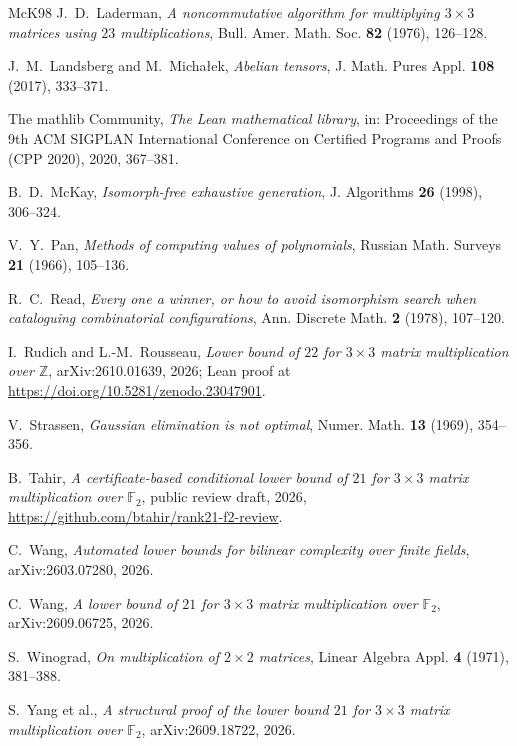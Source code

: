 \documentclass[11pt]{amsart}
\theoremstyle{definition}
\theoremstyle{remark}
\numberwithin{equation}{section}
\newcommand{\F}{\mathbb{F}_2}
\newcommand{\Z}{\mathbb{Z}}
\begin{document}
\begin{thebibliography}{McK98}
J.~D.~Laderman, \emph{A noncommutative algorithm for multiplying $3\times 3$ matrices using $23$ multiplications}, Bull. Amer. Math. Soc. \textbf{82} (1976), 126--128.

J.~M.~Landsberg and M.~Micha\l{}ek, \emph{Abelian tensors}, J. Math. Pures Appl. \textbf{108} (2017), 333--371.

The mathlib Community, \emph{The Lean mathematical library}, in: Proceedings of the 9th ACM SIGPLAN International Conference on Certified Programs and Proofs (CPP 2020), 2020, 367--381.

B.~D.~McKay, \emph{Isomorph-free exhaustive generation}, J. Algorithms \textbf{26} (1998), 306--324.

V.~Y.~Pan, \emph{Methods of computing values of polynomials}, Russian Math. Surveys \textbf{21} (1966), 105--136.

R.~C.~Read, \emph{Every one a winner, or how to avoid isomorphism search when cataloguing combinatorial configurations}, Ann. Discrete Math. \textbf{2} (1978), 107--120.

I.~Rudich and L.-M.~Rousseau, \emph{Lower bound of $22$ for $3\times 3$ matrix multiplication over $\Z$}, arXiv:2610.01639, 2026; Lean proof at \url{https://doi.org/10.5281/zenodo.23047901}.

V.~Strassen, \emph{Gaussian elimination is not optimal}, Numer. Math. \textbf{13} (1969), 354--356.

B.~Tahir, \emph{A certificate-based conditional lower bound of $21$ for $3\times 3$ matrix multiplication over $\F$}, public review draft, 2026, \url{https://github.com/btahir/rank21-f2-review}.

C.~Wang, \emph{Automated lower bounds for bilinear complexity over finite fields}, arXiv:2603.07280, 2026.

C.~Wang, \emph{A lower bound of $21$ for $3\times 3$ matrix multiplication over $\F$}, arXiv:2609.06725, 2026.

S.~Winograd, \emph{On multiplication of $2\times 2$ matrices}, Linear Algebra Appl. \textbf{4} (1971), 381--388.

S.~Yang et al., \emph{A structural proof of the lower bound $21$ for $3\times 3$ matrix multiplication over $\F$}, arXiv:2609.18722, 2026.

\end{thebibliography}
\end{document}
